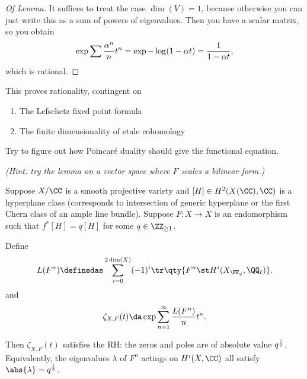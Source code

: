 \begin{proof}[Of Lemma]

It suffices to treat the case \(\dim(V) = 1\), because otherwise you can
just write this as a sum of powers of eigenvalues. Then you have a
scalar matrix, so you obtain
\begin{align*}  
\exp{ \sum {\alpha^n \over n} t^n} = \exp{ -\log(1 - \alpha t)} = {1 \over 1-\alpha t}
,\end{align*} which is rational.

\end{proof}

This proves rationality, contingent on

\begin{enumerate}
\def\labelenumi{\arabic{enumi}.}
\tightlist
\item
  The Lefschetz fixed point formula
\item
  The finite dimensionality of etale cohomology
\end{enumerate}

\begin{exercise}

Try to figure out how Poincaré duality should give the functional
equation.

\emph{(Hint: try the lemma on a vector space where \(F\) scales a
bilinear form.)}

\end{exercise}

\begin{theorem}

Suppose \(X/\CC\) is a smooth projective variety and
\([H] \in H^2(X(\CC), \CC)\) is a hyperplane class (corresponds to
intersection of generic hyperplane or the first Chern class of an ample
line bundle). Suppose \(F:X\to X\) is an endomorphism such that
\(f^*[H] = q[H]\) for some \(q\in \ZZ_{\geq 1}\).

Define
\begin{align*}  
L(F^n) \definedas 
\sum_{i=0}^{2\dim(X)} (-1)^i \tr\qty{ F^n \st H^i(X_{\FF_q}, \QQ_\ell)}
.\end{align*} and
\begin{align*}  
\zeta_{X, F}(t) \da
\exp{\sum_{n=1}^\infty {L(F^n) \over n}t^n }
.\end{align*}

Then \(\zeta_{X, F}(t)\) satisfies the RH: the zeros and poles are of
absolute value \(q^{i\over 2}\). Equivalently, the eigenvalues
\(\lambda\) of \(F^n\) actings on \(H^i(X, \CC)\) all satisfy
\(\abs{\lambda} = q^{i\over 2}\).

\end{theorem}

